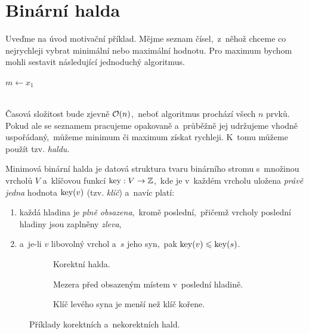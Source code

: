 \section{Binární halda}\label{sec:halda}
Uveďme na úvod motivační příklad. Mějme seznam čísel,~z~něhož chceme co nejrychleji vybrat minimální nebo maximální hodnotu. Pro maximum bychom mohli sestavit následující jednoduchý algoritmus.
\begin{algorithm}
    \caption{Vyhledání maximální hodnoty v~seznamu (\textsc{Max})}
    \label{alg:max}
    $m\gets x_1$\\
    \\
\end{algorithm}

Časová složitost bude zjevně $\mathcal{O}(n)$,~neboť algoritmus prochází všech $n$ prvků. Pokud ale se seznamem pracujeme opakovaně a~průběžně jej udržujeme vhodně uspořádaný,~můžeme minimum či maximum získat rychleji. K~tomu můžeme použít tzv. \emph{haldu}.
\begin{definition}\label{def:binarni_halda}
    Minimová binární halda je datová struktura tvaru binárního stromu s~množinou vrcholů $V$ a~klíčovou funkcí $\operatorname{key}:V \rightarrow \mathbb{Z}$,~kde je v~každém vrcholu uložena \emph{právě jedna} hodnota $\operatorname{key}(v)$ (tzv. \emph{klíč}) a~navíc platí:
    \begin{enumerate}[label=(\roman*)]
        \item\label{binhalda_podminka_1} každá hladina je \emph{plně obsazena},~kromě poslední,~přičemž vrcholy poslední hladiny jsou zaplněny \emph{zleva},
        \item\label{binhalda_podminka_2} a~je-li $v$ libovolný vrchol a~$s$ jeho syn,~pak $\operatorname{key}(v)\leqslant\operatorname{key}(s)$.
    \end{enumerate}
\end{definition}

\begin{figure}[ht]
    \centering
    \begin{subfigure}{6cm}
        \centering
        
        \caption{Korektní halda.}
        \label{subfig:korektni_halda}
    \end{subfigure}
    \quad
    \begin{subfigure}{5cm}
        \centering
        
        \caption{Mezera před obsazeným místem v~poslední hladině.}
        \label{subfig:nekorektni_halda_1}
    \end{subfigure}
    \quad
    \begin{subfigure}{5cm}
        \centering
        
        \caption{Klíč levého syna je menší než klíč kořene.}
        \label{subfig:nekorektni_halda_2}
    \end{subfigure}
    \caption{Příklady korektních a~nekorektních hald.}
    \label{fig:halda_modely}
\end{figure}

